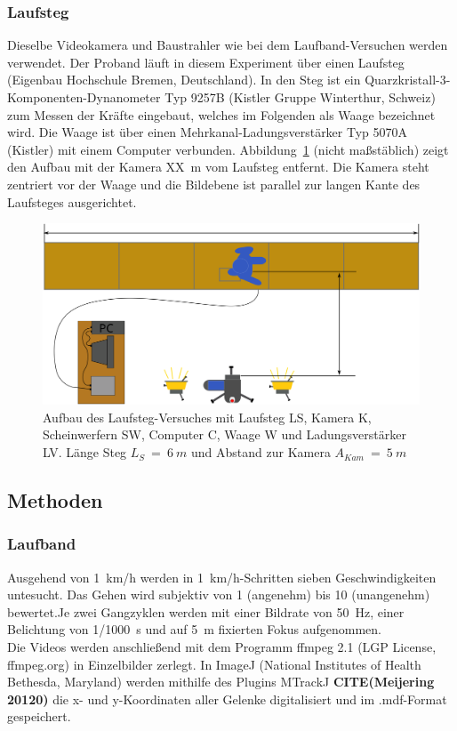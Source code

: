 \subsubsection{Laufsteg}
Dieselbe Videokamera und Baustrahler wie bei dem Laufband-Versuchen werden verwendet. Der Proband läuft in diesem Experiment über einen Laufsteg (Eigenbau Hochschule Bremen, Deutschland). In den Steg ist ein Quarzkristall-3-Komponenten-Dynanometer Typ 9257B (Kistler Gruppe Winterthur, Schweiz) zum Messen der Kräfte eingebaut, welches im Folgenden als Waage bezeichnet wird. Die Waage ist über einen Mehrkanal-Ladungsverstärker Typ 5070A (Kistler) mit einem Computer verbunden. Abbildung~\ref{fig:laufstg_stp} (nicht maßstäblich) zeigt den Aufbau mit der Kamera XX~m vom Laufsteg entfernt. Die Kamera steht zentriert vor der Waage und die Bildebene ist parallel zur langen Kante des Laufsteges ausgerichtet.

\begin{figure}[h!]
	\centering
	\includegraphics[width=0.7\linewidth]{bilder/mat_met/Laufsteg_setup}
	\caption[Aufbau Laufsteg Versuch]{Aufbau des Laufsteg-Versuches mit Laufsteg LS, Kamera K, Scheinwerfern SW, Computer C, Waage W und Ladungsverstärker LV. Länge Steg $L_S~=~6~m$ und Abstand zur Kamera $A_{Kam}~=~5~m$}
	\label{fig:laufstg_stp}
\end{figure}

\subsection{Methoden}
\subsubsection{Laufband}
Ausgehend von 1~km/h werden in 1~km/h-Schritten sieben Geschwindigkeiten untesucht. Das Gehen wird subjektiv von 1 (angenehm) bis 10 (unangenehm) bewertet.Je zwei Gangzyklen werden mit einer Bildrate von 50~Hz, einer Belichtung von 1/1000~s und auf 5~m fixierten Fokus aufgenommen.\\
Die Videos werden anschließend mit dem Programm ffmpeg 2.1 (LGP License, ffmpeg.org) in Einzelbilder zerlegt. In ImageJ (National Institutes of Health Bethesda, Maryland) werden mithilfe des Plugins MTrackJ \textbf{CITE(Meijering 20120)} die x- und y-Koordinaten aller Gelenke digitalisiert und im .mdf-Format gespeichert.

